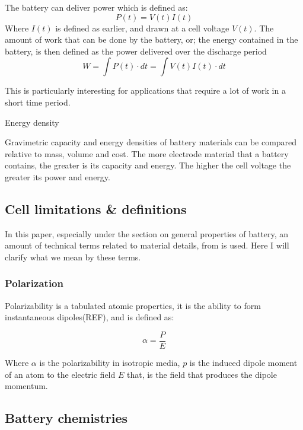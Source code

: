 	The battery can deliver power which is defined as:
	\begin{equation}
	P(t)=V(t)I(t)
	\end{equation}
	Where $I(t)$ is defined as earlier, and drawn at a cell voltage $V(t)$. The amount of work that can be done by the battery, or; the energy contained in the battery, is then defined as the power delivered over the discharge period
	\begin{equation}
	W = \int P(t) \cdot dt = \int V(t)I(t) \cdot dt
	\end{equation}
	
	This is particularly interesting for applications that require a lot of work in a short time period.
	
	Energy density 
	
	
	Gravimetric capacity and energy densities of battery materials can be compared relative to mass, volume and cost. The more electrode material that a battery contains, the greater is its capacity and energy. The higher the cell voltage the greater its power and energy. 
	


\subsection{Cell limitations \& definitions }
In this paper, especially under the section on general properties of battery, an amount of technical terms related to material details, from  is used. Here I will clarify what we mean by these terms. 

	
	
	\subsubsection{Polarization}
	Polarizability is a tabulated atomic properties, it is the ability to form instantaneous dipoles(REF), and is defined as: 
	
	$$	\alpha = \frac{P}{E}	$$
	
	Where $\alpha $ is the polarizability in isotropic media, $p$ is the induced dipole moment of an atom to the electric field $E$ that, is the field that produces the dipole momentum. 
	
 



		



\subsection{Battery chemistries}

